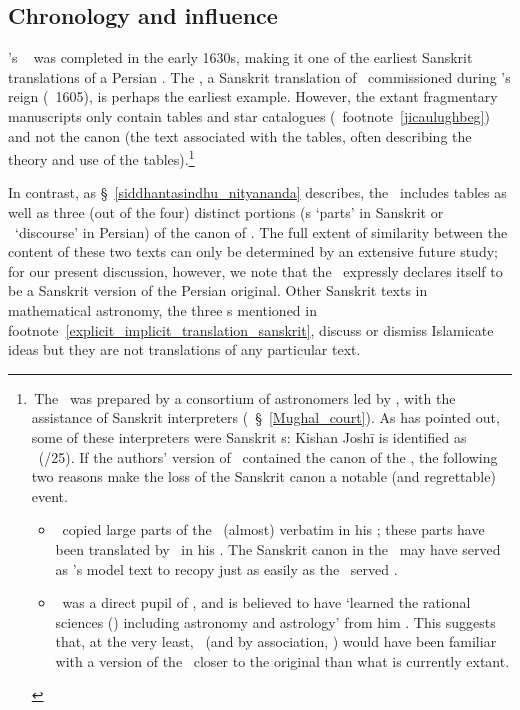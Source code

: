 \subsection{Chronology and influence}\label{chronology_influence}

\Nityananda's \Siddhantasindhu\ 
was completed in the early 1630s, making it one of the earliest Sanskrit translations of a Persian \zij. The \JicaUlugbegi, a Sanskrit translation of \ZijUlughBeg\ commissioned during \Akbar's reign (\ante\ 1605), is perhaps the earliest example. However, the extant fragmentary manuscripts only contain tables and star catalogues (\vid\ footnote~\ref{jicaulughbeg}) and not the canon (the text associated with the tables, often describing the theory and use of the tables).\footnote{\,The \JicaUlugbegi\ was prepared by a consortium of astronomers led by \AmirFathullahofShiraz, with the assistance of Sanskrit interpreters (\vid\  \S~\ref{Mughal_court}). As \textcite[367]{Sarmajyotisaraja} has pointed out, some of these interpreters were Sanskrit \jyotisa s: \eg Kishan Joshī is identified as  \Krsnadaivajna\ (\fl {}/25). If the authors' version of \JicaUlugbegi\ contained the canon of the \ZijUlughBeg, the following two reasons make the loss of the Sanskrit canon a notable (and regrettable) event.
\begin{itemize}
    \item \MullaFarid\ copied large parts of the \ZijUlughBeg\ (almost) verbatim in his \ZijiShahJahani; these parts have been translated by \Nityananda\ in his \Siddhantasindhu. The Sanskrit canon in the \JicaUlugbegi\ may have served as \Nityananda's model text to recopy just as easily as the \ZijUlughBeg\ served \MullaFarid.
    \item \MullaFarid\ was a direct pupil of \AmirFathullahofShiraz, and is believed to have `learned the rational sciences (\UlumiAqliyah) including astronomy and astrology' from him \parencite[720]{Ansarimedievalindia}. This suggests that, at the very least, \MullaFarid\ (and by association, \Nityananda) would have been familiar with a version of the \JicaUlugbegi\ closer to the original than what is currently extant.
\end{itemize}} %

In contrast, as \S~\ref{siddhantasindhu_nityananda} describes, the \Siddhantasindhu\ includes tables as well as three (out of the four) distinct portions (\kanda s `parts' in Sanskrit or \maqalat\ `discourse' in Persian) of the canon of \ZijiShahJahani. The full extent of similarity between the content of these two texts can only be determined by an extensive future study; for our present discussion, however, we note that the \Siddhantasindhu\ expressly declares itself to be a Sanskrit version of the Persian original. Other Sanskrit texts in mathematical astronomy, \eg the three \siddhanta s mentioned in footnote~\ref{explicit_implicit_translation_sanskrit}, discuss or dismiss Islamicate ideas but they are not translations of any particular text. 

